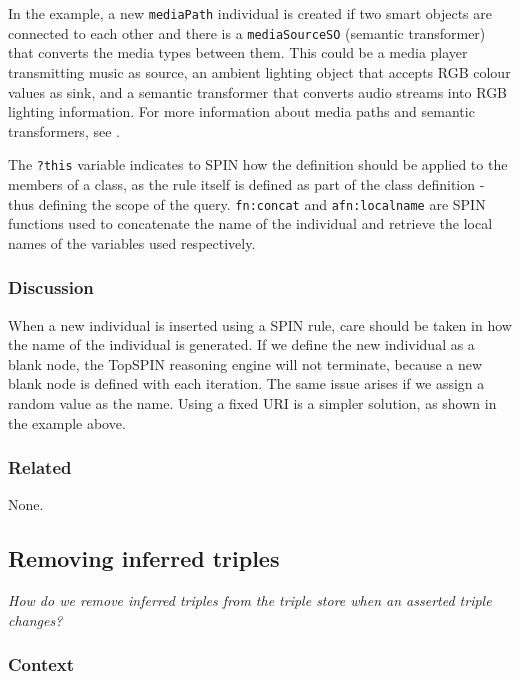 In the example, a new \texttt{mediaPath} individual is created if two smart objects are connected to each other and there is a \texttt{mediaSourceSO} (semantic transformer) that converts the media types between them. This could be a media player transmitting music as source, an ambient lighting object that accepts RGB colour values as sink, and a semantic transformer that converts audio streams into RGB lighting information. For more information about media paths and semantic transformers, see \cite{Niezen2011}.

The \texttt{?this} variable indicates to \ac{SPIN} how the definition should be applied to the members of a class, as the rule itself is defined as part of the class definition - thus defining the scope of the query. \texttt{fn:concat} and \texttt{afn:localname} are \ac{SPIN} functions used to concatenate the name of the individual and retrieve the local names of the variables used respectively.

\subsubsection{Discussion}

When a new individual is inserted using a \ac{SPIN} rule, care should be taken in how the name of the individual is generated. If we define the new individual as a blank node, the TopSPIN reasoning engine will not terminate, because a new blank node is defined with each iteration. The same issue arises if we assign a random value as the name. Using a fixed URI is a simpler solution, as shown in the example above.

\subsubsection{Related}

None.





\subsection{Removing inferred triples}

\emph{How do we remove inferred triples from the triple store when an asserted triple changes?}
\subsubsection{Context}

